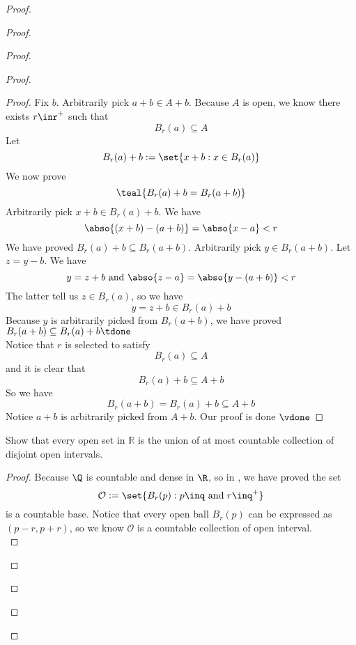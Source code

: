 \documentclass{report}
\begin{document}
\begin{proof}
\begin{proof}
\begin{proof}
\begin{proof}
\begin{proof}
Fix $b$. Arbitrarily pick $a+b\in A+b$. Because $A$ is open, we know there exists $r\inr^+$ such that
\begin{equation}
B_r(a)\subseteq A
\end{equation}
Let
\begin{equation}
B_r(a)+b:=\set{x+b:x\in B_r(a)}
\end{equation}
We now prove 
\begin{equation}
\teal{B_r(a)+b=B_r(a+b)}
\end{equation}
Arbitrarily pick $x+b\in B_r(a)+b$. We have
\begin{equation}
\abso{(x+b)-(a+b)}=\abso{x-a}<r
\end{equation}
We have proved $B_r(a)+b\subseteq B_r(a+b)$. Arbitrarily pick $y\in B_r(a+b)$. Let $z=y-b$. We have
\begin{equation}
y=z+b\text{ and }\abso{z-a}=\abso{y-(a+b)}<r
\end{equation}
The latter tell us $z \in B_r(a)$, so we have
\begin{equation}
y=z+b \in B_r(a)+b
\end{equation}
Because $y$ is arbitrarily picked from $B_r(a+b)$, we have proved $B_r(a+b)\subseteq B_r(a)+b\tdone$\\

Notice that  $r$ is selected to satisfy
\begin{equation}
B_r(a)\subseteq A
\end{equation}
and it is clear that
\begin{equation}
B_r(a)+b\subseteq A+b
\end{equation}
So we have
\begin{equation}
B_r(a+b)=B_r(a)+b\subseteq A+b
\end{equation}
Notice $a+b$ is arbitrarily picked from $A+b$. Our proof is done  $\vdone$
\end{proof}

\begin{question}{}{}
Show that every open set in \( \mathbb{R} \) is the union of at most countable collection of disjoint open intervals.
\end{question}
\begin{proof}
Because $\Q$ is countable and dense in  $\R$, so in , we have proved the set
\begin{equation}
\mathcal{O}:=\set{B_r(p):p\inq\text{ and }r\inq^+}
\end{equation}
is a countable base. Notice that every open ball $B_r(p)$ can be expressed as $(p-r,p+r)$, so we know $\mathcal{O}$ is a countable collection of open interval.\\


\end{proof}
\end{proof}
\end{proof}
\end{proof}
\end{proof}
\end{document}
